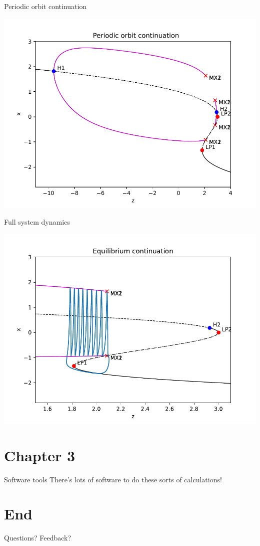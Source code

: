 \documentclass[presentation]{beamer}
\begin{document}
\begin{frame}[label={sec:org805587b}]{Periodic orbit continuation}
\begin{center}
\includegraphics[height=.9\textheight]{./epc-2.pdf}
\end{center}
\end{frame}

\begin{frame}[label={sec:org5d9dbd5}]{Full system dynamics}
\begin{center}
\includegraphics[height=.9\textheight]{./burster_diagram.pdf}
\end{center}
\end{frame}

\section{Chapter 3}
\label{sec:orgece099e}
\begin{frame}[label={sec:org54c31b8}]{Software tools}
There's lots of software to do these sorts of calculations!
\end{frame}

\section{End}
\label{sec:org03291ff}
\begin{frame}[label={sec:orgf568cca}]{}
\begin{center}
Questions? Feedback?
\end{center}
\end{frame}
\end{document}

